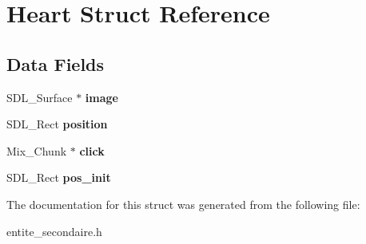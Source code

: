 \hypertarget{structHeart}{}\section{Heart Struct Reference}
\label{structHeart}
\subsection*{Data Fields}
\begin{DoxyCompactItemize}
\item 
\mbox{\label{structHeart_a9a0f6ed60e258415e83bdb5a3118e151}} 
S\+D\+L\+\_\+\+Surface $\ast$ {\bfseries image}
\item 
\mbox{\label{structHeart_ac4d13d2d7a77af3cd8822b18d35168a2}} 
S\+D\+L\+\_\+\+Rect {\bfseries position}
\item 
\mbox{\label{structHeart_a9a9aa1322dd7d19c8fae369723ebd865}} 
Mix\+\_\+\+Chunk $\ast$ {\bfseries click}
\item 
\mbox{\label{structHeart_a58e54316de92b359afa6c753b689fbdc}} 
S\+D\+L\+\_\+\+Rect {\bfseries pos\+\_\+init}
\end{DoxyCompactItemize}


The documentation for this struct was generated from the following file\+:\begin{DoxyCompactItemize}
\item 
entite\+\_\+secondaire.\+h\end{DoxyCompactItemize}
